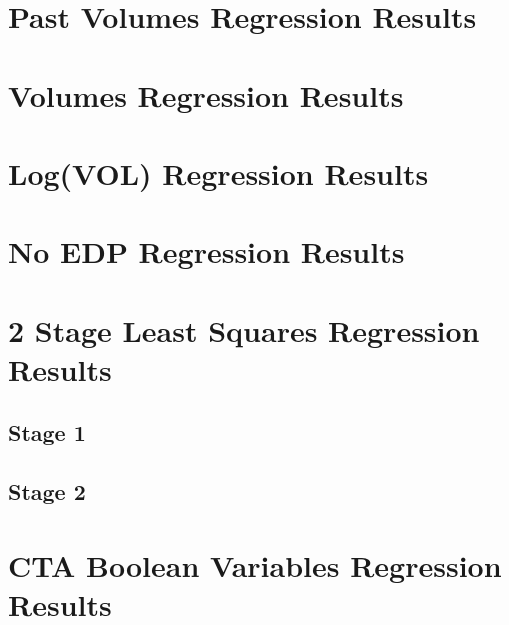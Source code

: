 \documentclass{article}
\begin{document}
\begin{appendices}

\section{Past Volumes Regression Results}


\pagebreak

\section{Volumes Regression Results}


\pagebreak

\section{Log(VOL) Regression Results}


\pagebreak

\section{No EDP Regression Results}


\pagebreak

\section{2 Stage Least Squares Regression Results}

\subsection{Stage 1}


\pagebreak

\subsection{Stage 2}


\pagebreak

\section{CTA Boolean Variables Regression Results}



\end{appendices}
\end{document}
